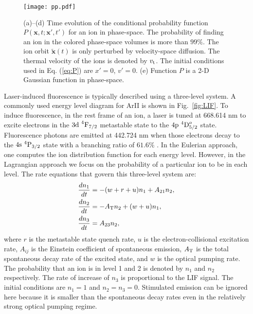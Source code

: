 \documentclass[aip,pop,reprint]{revtex4-1}
\begin{document}
\begin{figure*}
\begin{center}
\texttt{[image: pp.pdf]}
\caption{(a)--(d) Time evolution of the conditional probability function $P(\mathbf{x},t;\mathbf{x'},t')$ for an ion in phase-space. The probability of finding an ion in the colored phase-space volumes is more than $99\%$. The ion orbit $\mathbf{\tilde{x}}(t)$ is only perturbed by velocity-space diffusion. The thermal velocity of the ions is denoted by $v_\textup{t}$. The initial conditions used in Eq. (\ref{eq:P}) are $x'=0$, $v'=0$. (e) Function $P$ is a 2-D Gaussian function in phase-space.}
\label{fig:P}
\end{center}
\end{figure*}

Laser-induced fluorescence is typically described using a three-level system. A commonly used energy level diagram for ArII \cite{mattingly_measurement_2013} is shown in Fig.~\ref{fig:LIF}. To induce fluorescence, in the rest frame of an ion, a laser is tuned at 668.614 nm to excite electrons in the $\textup{3d }^4\textup{F}_{7/2}$ metastable state to the $\textup{4p }^4\textup{D}_{5/2}^{o}$ state. Fluorescence photons are emitted at 442.724 nm when those electrons decay to the $\textup{4s }^4\textup{P}_{3/2}$ state with a branching ratio of $61.6\%$ \cite{severn_argon_1998}. In the Eulerian approach, one computes the ion distribution function for each energy level. However, in the Lagrangian approach we focus on the probability of a particular ion to be in each level. The rate equations that govern this three-level system are:
\begin{subequations}
\begin{align}
\label{eq:rate1}
\frac{dn_1}{dt}&=-(w+r+u)n_1+A_{21}n_2,\\
\label{eq:rate2}
\frac{dn_2}{dt}&=-A_\textup{T}n_2+(w+u)n_1,\\
\label{eq:rate3}
\frac{dn_3}{dt}&=A_{23}n_2,
\end{align}
\end{subequations}
where $r$ is the metastable state quench rate, $u$ is the electron-collisional excitation rate, $A_{ij}$ is the Einstein coefficient of spontaneous emission, $A_\textup{T}$ is the total spontaneous decay rate of the excited state, and $w$ is the optical pumping rate. The probability that an ion is in level 1 and 2 is denoted by $n_1$ and $n_2$ respectively. The rate of increase of $n_3$ is proportional to the LIF signal. The initial conditions are $n_1=1$ and $n_2=n_3=0$. Stimulated emission can be ignored here because it is smaller than the spontaneous decay rates even in the relatively strong optical pumping regime.
\end{document}
